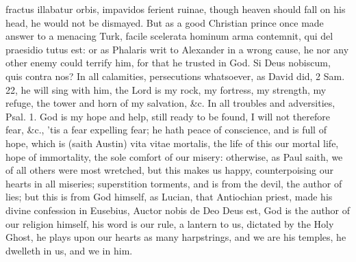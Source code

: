 {fractus illabatur orbis, impavidos ferient ruinae, though heaven should
fall on his head, he would not be dismayed. But as a good Christian
prince once made answer to a menacing Turk, facile scelerata hominum
arma contemnit, qui del praesidio tutus est: or as  Phalaris writ
to Alexander in a wrong cause, he nor any other enemy could terrify
him, for that he trusted in God. Si Deus nobiscum, quis contra nos? In
all calamities, persecutions whatsoever, as David did, 2 Sam.  22,
he will sing with him, the Lord is my rock, my fortress, my strength,
my refuge, the tower and horn of my salvation, \&c. In all troubles and
adversities, Psal.  1. God is my hope and help, still ready to be
found, I will not therefore fear, \&c., 'tis a fear expelling fear; he
hath peace of conscience, and is full of hope, which is (saith
Austin) vita vitae mortalis, the life of this our mortal life,
hope of immortality, the sole comfort of our misery: otherwise, as Paul
saith, we of all others were most wretched, but this makes us happy,
counterpoising our hearts in all miseries; superstition torments, and
is from the devil, the author of lies; but this is from God himself, as
Lucian, that Antiochian priest, made his divine confession in
Eusebius, Auctor nobis de Deo Deus est, God is the author of our
religion himself, his word is our rule, a lantern to us, dictated by
the Holy Ghost, he plays upon our hearts as many harpstrings, and we
are his temples, he dwelleth in us, and we in him.

}
